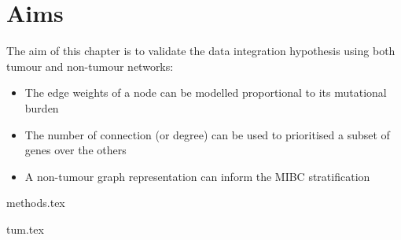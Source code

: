 \section{Aims}

The aim of this chapter is to validate the data integration hypothesis using both tumour and non-tumour networks:

\begin{itemize}
    \item The edge weights of a node can be modelled proportional to its mutational burden
    \item The number of connection (or degree) can be used to prioritised a subset of genes over the others
    \item A non-tumour graph representation can inform the MIBC stratification 
\end{itemize}


{methods.tex}



{tum.tex}



